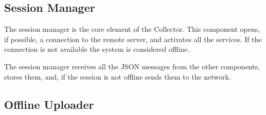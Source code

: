 \documentclass[a4paper,notitlepage,onecolumn]{hitec}  %
\begin{document}
\subsection{Session Manager}

The session manager is the core element of the Collector. This component opens, if possible, a connection to the remote server, and activates all the services. If the connection is not available the system is considered offline.

The session manager receives all the JSON messages from the other components, stores them, and, if the session is not offline sends them to the network.

\subsection{Offline Uploader}





\end{document}
